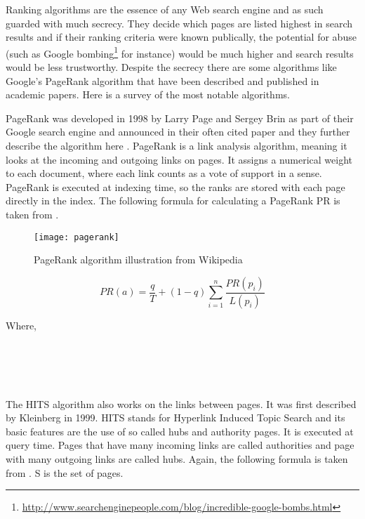 Ranking algorithms are the essence of any Web search engine and as such guarded with much secrecy. They decide which pages are listed highest in search results and if their ranking criteria were known publically, the potential for abuse (such as Google bombing\footnote{\url{http://www.searchenginepeople.com/blog/incredible-google-bombs.html}} for instance) would be much higher and search results would be less trustworthy. Despite the secrecy there are some algorithms like Google's PageRank algorithm that have been described and published in academic papers. Here is a survey of the most notable algorithms.

PageRank was developed in 1998 by Larry Page and Sergey Brin as part of their Google search engine and announced in their often cited paper \autocite{Brin1998b} and they further describe the algorithm here \autocite{Brin1998}. PageRank is a link analysis algorithm, meaning it looks at the incoming and outgoing links on pages. It assigns a numerical weight to each document, where each link counts as a vote of support in a sense. PageRank is executed at indexing time, so the ranks are stored with each page directly in the index. The following formula for calculating a PageRank PR is taken from \autocite[p.472]{Baeza-Yates2011}.

\begin{figure}[htb] %
  \centering
  \texttt{[image: pagerank]}
\caption[PageRank algorithm]{PageRank algorithm illustration from Wikipedia}
\label{fig:pagerank2}
\end{figure}

\begin{equation}
  PR(a) =
  \frac{q}{T} + (1 - q)
  \sum_{i=1}^{n} \frac{PR(p_i)}{L(p_i)}
  \label{eq:PRt}
\end{equation}

Where,\\
 \\
 \\
 \\
 \\
\itab{} 

The HITS algorithm also works on the links between pages. It was first described by Kleinberg \autocite[p.472]{Kleinberg1999, Kleinberg} in 1999. HITS stands for Hyperlink Induced Topic Search and its basic features are the use of so called hubs and authority pages. It is executed at query time. Pages that have many incoming links are called authorities and page with many outgoing links are called hubs. Again, the following formula is taken from \autocite[p.471]{Baeza-Yates2011}. S is the set of pages.

